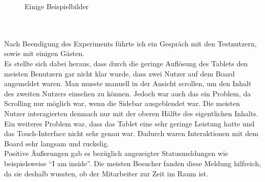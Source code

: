 \begin{figure}[h!]
{      \label{img:experiment04}
    }
  \caption{Einige Beispielbilder}
\end{figure}
\\
\\
Nach Beendigung des Experiments führte ich ein Gespräch mit den Testnutzern, sowie mit einigen Gästen.\\
Es stellte sich dabei heraus, dass durch die geringe Auflösung des Tablets den meisten Benutzern gar nicht klar wurde, dass zwei Nutzer auf dem Board angemeldet waren. Man musste manuell in der Ansicht scrollen, um den Inhalt des zweiten Nutzers einsehen zu können. Jedoch war auch das ein Problem, da Scrolling nur möglich war, wenn die Sidebar ausgeblendet war. Die meisten Nutzer interagierten demnach nur mit der oberen Hälfte des eigentlichen Inhalts.\\
Ein weiteres Problem war, dass das Tablet eine sehr geringe Leistung hatte und das Touch-Interface nicht sehr genau war. Dadurch waren Interaktionen mit dem Board sehr langsam und ruckelig.\\
Positive Äußerungen gab es bezüglich angezeigter Statusmeldungen wie beispielsweise ``I am inside''. Die meisten Besucher fanden diese Meldung hilfreich, da sie deshalb wussten, ob der Mitarbeiter zur Zeit im Raum ist.
